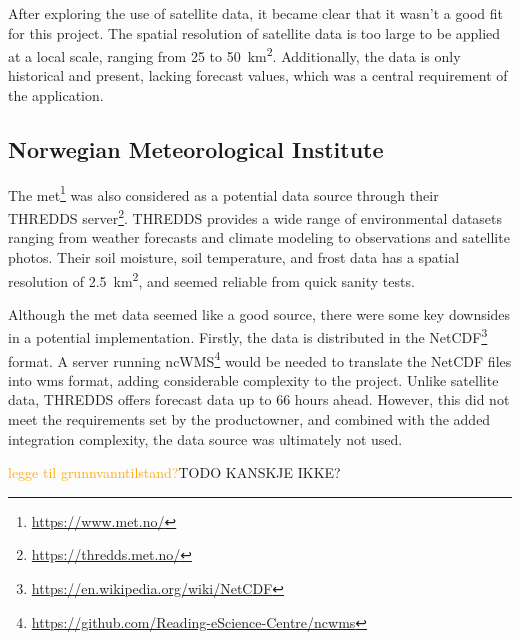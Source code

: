 After exploring the use of satellite data, it became clear that it wasn't a good fit for this project. The spatial resolution of satellite data is too large to be applied at a local scale, ranging from \qty{25}{} to \qty{50}{\kilo\meter\squared}. Additionally, the data is only historical and present, lacking forecast values, which was a central requirement of the application. 

\subsection{Norwegian Meteorological Institute}

The \acrfull{met}\footnote{\url{https://www.met.no/}} was also considered as a potential data source through their THREDDS server\footnote{\url{https://thredds.met.no/}}. THREDDS provides a wide range of environmental datasets ranging from weather forecasts and climate modeling to observations and satellite photos. Their soil moisture, soil temperature, and frost data has a spatial resolution of \qty{2.5}{\kilo\meter\squared}, and seemed reliable from quick sanity tests.

Although the \acrshort{met} data seemed like a good source, there were some key downsides in a potential implementation. Firstly, the data is distributed in the NetCDF\footnote{\url{https://en.wikipedia.org/wiki/NetCDF}} format. A server running ncWMS\footnote{\url{https://github.com/Reading-eScience-Centre/ncwms}} would be needed to translate the NetCDF files into \gls{wms} format, adding considerable complexity to the project. Unlike satellite data, THREDDS offers forecast data up to \qty{66}{} hours ahead. However, this did not meet the requirements set by the \gls{productowner}, and combined with the added integration complexity, the data source was ultimately not used.

\textcolor{orange}{legge til grunnvanntilstand?}TODO KANSKJE IKKE? 